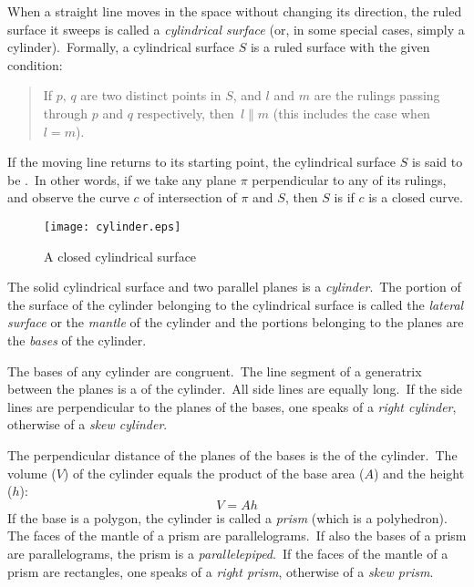 \documentclass[12pt]{article}
\theoremstyle{definition}
\begin{document}

When a straight line moves in the space without changing its direction, the ruled surface it sweeps is called a {\em cylindrical surface} (or, in some special cases, simply a cylinder).\, Formally, a cylindrical surface $S$ is a ruled surface with the given condition: 
\begin{quote}
If $p,\,q$ are two distinct points in $S$, and $l$ and $m$ are the rulings passing through $p$ and $q$ respectively, then\, $l \parallel m$ (this includes the case when\, $l = m$).
\end{quote}
If the moving line returns to its starting point, the cylindrical surface $S$ is said to be .\, In other words, if we take any plane $\pi$ perpendicular to any of its rulings, and observe the curve $c$ of intersection of $\pi$ and $S$, then $S$ is  if $c$ is a closed curve.

\begin{figure}
\begin{center}
\texttt{[image: cylinder.eps]}
\end{center}
\caption{A closed cylindrical surface}
\end{figure}

The solid  cylindrical surface and two parallel planes is a {\em cylinder}.\, The portion of the surface of the cylinder belonging to the cylindrical surface is called the {\em lateral surface} or the {\em mantle} of the cylinder and the portions belonging to the planes are the {\em bases} of the cylinder.

The bases of any cylinder are congruent.\, The line segment of a generatrix between the planes is a  of the cylinder.\, All side lines are equally long.\, If the side lines are perpendicular to the planes of the bases, one speaks of a {\em right cylinder}, otherwise of a {\em skew cylinder}.

The perpendicular distance of the planes of the bases is the  of the cylinder.\, The volume ($V$) of the cylinder equals the product of the base area ($A$) and the height ($h$):
                              $$V = Ah$$
If the base is a polygon, the cylinder is called a {\em prism} (which is a polyhedron).\, The faces of the mantle of a prism are parallelograms.\, If also the bases of a prism are parallelograms, the prism is a {\em parallelepiped}.\, If the faces of the mantle of a prism are rectangles, one speaks of a {\em right prism}, otherwise of a {\em skew prism}.\, 
\end{document}
